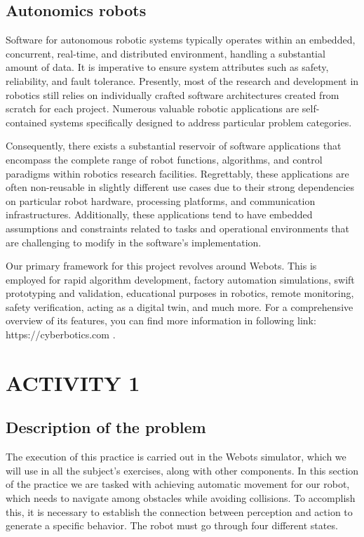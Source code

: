 \documentclass[conference]{IEEEtran}
\begin{document}
\subsection{Autonomics robots}

Software for autonomous robotic systems typically operates within an embedded, concurrent, real-time, and distributed environment, handling a substantial amount of data. It is imperative to ensure system attributes such as safety, reliability, and fault tolerance. Presently, most of the research and development in robotics still relies on individually crafted software architectures created from scratch for each project. Numerous valuable robotic applications are self-contained systems specifically designed to address particular problem categories.

Consequently, there exists a substantial reservoir of software applications that encompass the complete range of robot functions, algorithms, and control paradigms within robotics research facilities. Regrettably, these applications are often non-reusable in slightly different use cases due to their strong dependencies on particular robot hardware, processing platforms, and communication infrastructures. Additionally, these applications tend to have embedded assumptions and constraints related to tasks and operational environments that are challenging to modify in the software's implementation.

Our primary framework for this project revolves around Webots. This is employed for rapid algorithm development, factory automation simulations, swift prototyping and validation, educational purposes in robotics, remote monitoring, safety verification, acting as a digital twin, and much more. For a comprehensive overview of its features, you can find more information in following link: https://cyberbotics.com .


\section{ACTIVITY 1 }


\subsection{Description of the problem}\label{AA}
The execution of this practice is carried out in the Webots simulator, which we will use in all the subject's exercises, along with other components. In this section of the practice we are tasked with achieving automatic movement for our robot, which needs to navigate among obstacles while avoiding collisions. To accomplish this, it is necessary to establish the connection between perception and action to generate a specific behavior. The robot must go through four different states.
\end{document}
